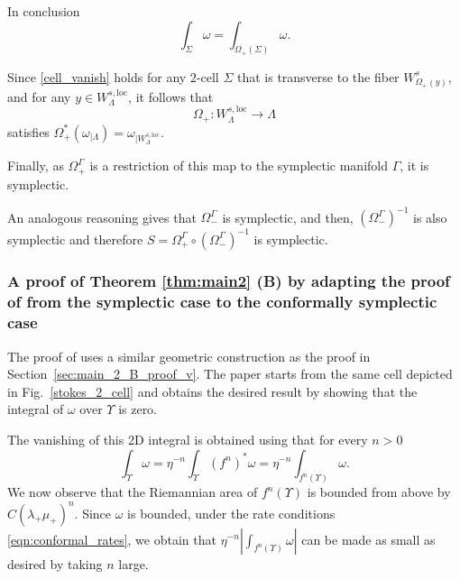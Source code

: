 \documentclass[11pt]{amsart}
\theoremstyle{definition}
\theoremstyle{remark}
\numberwithin{equation}{section}
\begin{document}
In conclusion
\begin{equation}\label{cell_vanish}
\int_{\Sigma} \omega=\int_{\Omega_+(\Sigma)} \omega.
\end{equation}

Since \eqref{cell_vanish} holds for any $2$-cell  $\Sigma$ that is  transverse to the fiber
$W^s_{\Omega_+(y)}$, and for any $y\in W^{s,\textrm{loc}}_\Lambda$, it follows that
\[
\Omega_+: W^{s,\textrm{loc}}_\Lambda\to \Lambda
\]
satisfies  $\Omega_+^* (\omega_{\mid \Lambda})=\omega_{\mid W^{s,\textrm{loc}}_\Lambda}$.

Finally,
as $\Omega _+^\Gamma$
is a restriction of this map to the symplectic manifold $\Gamma$, it is  symplectic.
\bigskip


An analogous reasoning gives that $\Omega_-^\Gamma$ is symplectic, and then,  $(\Omega _-^\Gamma)^{-1}$ is also symplectic and therefore $S=\Omega _+^\Gamma\circ (\Omega _-^\Gamma)^{-1}$ is  symplectic.
%
%
%


\subsubsection{A proof of Theorem \ref{thm:main2}  (B)  by adapting the proof of \cite{DLS08} from the symplectic case to the conformally symplectic case}
\label{sec:original_proof}
The proof of \cite{DLS08} uses a similar geometric  construction as the proof in
Section~\ref{sec:main_2_B_proof_v}.
The paper \cite{DLS08} starts from the same cell depicted in
Fig.~\ref{stokes_2_cell} and obtains the desired result  by showing that the integral
of $\omega$ over $\Upsilon$
is zero.


The vanishing of this 2D integral is obtained using that for every $n > 0$
\[
\int_{\Upsilon} \omega = \eta^{-n} \int_{\Upsilon} ({f^n})^* \omega =
\eta^{-n} \int_{f^n (\Upsilon)} \omega.
\]
We now observe that the Riemannian area of $f^n( \Upsilon)$ is bounded from above by $C(\lambda_+ \mu_+)^n$.
Since $\omega$ is bounded, under the rate conditions \eqref{eqn:conformal_rates}, we obtain that
$ \eta^{-n} \left| \int_{f^n (\Upsilon)} \omega \right|$ can be made
as small as desired by taking $n$ large.
\end{document}
